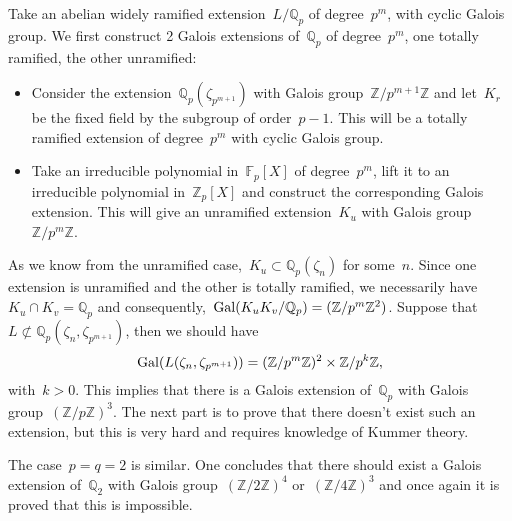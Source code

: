 Take an abelian widely ramified extension~$L/\mathbb{Q}_p$ of degree~$p^m$, with cyclic Galois group. We first construct 2 Galois extensions of~$\mathbb{Q}_p$ of degree~$p^m$, one totally ramified, the other unramified:
\begin{itemize}
  \item Consider the extension~$\mathbb{Q}_p(\zeta_{p^{m+1}})$ with Galois group~$\mathbb{Z}/p^{m+1}\mathbb{Z}$ and let~$K_r$ be the fixed field by the subgroup of order~$p-1$. This will be a totally ramified extension of degree~$p^m$ with cyclic Galois group.
  \item Take an irreducible polynomial in~$\mathbb{F}_p[X]$ of degree~$p^m$, lift it to an irreducible polynomial in~$\mathbb{Z}_p[X]$ and construct the corresponding Galois extension. This will give an unramified extension~$K_u$ with Galois group~$\mathbb{Z}/p^m\mathbb{Z}$.
\end{itemize}

As we know from the unramified case,~$K_u \subset \mathbb{Q}_p(\zeta_n)$ for some~$n$. Since one extension is unramified and the other is totally ramified, we necessarily have~$K_u \cap K_v = \mathbb{Q}_p$ and consequently,~$\operatorname{Gal}(K_uK_v/\mathbb{Q}_p) = (\mathbb{Z}/p^m\mathbb{Z}^2)$. Suppose that~$L \not\subset \mathbb{Q}_p(\zeta_n,\zeta_{p^{m+1}})$, then we should have
\begin{equation}
  \operatorname{Gal}(L(\zeta_n,\zeta_{p^{m+1}})) = (\mathbb{Z}/p^m\mathbb{Z})^2 \times\mathbb{Z}/p^k\mathbb{Z}, 
\end{equation}
with~$k > 0$. This implies that there is a Galois extension of~$\mathbb{Q}_p$ with Galois group~$(\mathbb{Z}/p\mathbb{Z})^3$. The next part is to prove that there doesn't exist such an extension, but this is very hard and requires knowledge of Kummer theory.

The case~$p=q=2$ is similar. One concludes that there should exist a Galois extension of~$\mathbb{Q}_2$ with Galois group~$(\mathbb{Z}/2\mathbb{Z})^4$ or~$(\mathbb{Z}/4\mathbb{Z})^3$ and once again it is proved that this is impossible.

